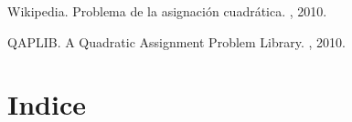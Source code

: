 \documentclass{ci5652}
\begin{document}
\begin{thebibliography}{99}

Wikipedia.
\newblock Problema de la asignación cuadrática.
,  2010.

QAPLIB.
\newblock A Quadratic Assignment Problem Library.
,  2010.

\end{thebibliography}


\newpage
\section*{Indice}
\tableofcontents

\end{document}

